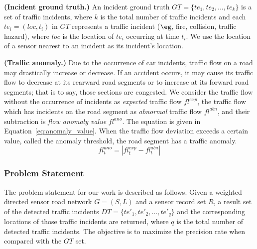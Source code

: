 \begin{Definition} \textbf{(Incident ground truth.)}
An incident ground truth $GT=\{te_1, te_2,...,te_k\}$ is a set of traffic incidents, where $k$ is the total number of traffic incidents and each $te_i = (loc, t_i)$ in $GT$ represents a traffic incident ($\eg$, fire, collision, traffic hazard), where $loc$ is the location of $te_i$ occurring at time $t_i$. We use the location of a sensor nearest to an incident as its incident's location. 
\end{Definition}

%
\begin{Definition} \textbf{(Traffic anomaly.)}
Due to the occurrence of car incidents, traffic flow on a road may drastically increase or decrease. If an accident occurs, it may cause its traffic flow to decrease at its rearward road segments or to increase at its forward road segments; that is to say, those sections are congested. We consider the traffic flow without the occurrence of incidents as \textit{expected} traffic flow $fl^{exp}$, the traffic flow which has incidents on the road segment as \textit{abnormal} traffic flow $fl^{abn}$, and their subtraction is \textit{flow anomaly value} $fl^{ano}$. The equation is given in Equation~\ref{eq:anomaly_value}. When the traffic flow deviation exceeds a certain value, called the anomaly threshold, the road segment has a traffic anomaly.
\begin{equation}\label{eq:anomaly_value}
	fl_t^{ano} = | fl_t^{exp} - fl_t^{abn} |
\end{equation} 
\end{Definition}

\subsubsection*{Problem Statement} 
The problem statement for our work is described as follows. Given a weighted directed sensor road network $G=(S,L)$ and a sensor record set $R$, a result set of the detected traffic incidents $DT=\{te'_1, te'_2,...,te'_q\}$ and the corresponding locations of those traffic incidents are returned, where $q$ is the total number of detected traffic incidents. The objective is to maximize the precision rate when compared with the $GT$ set.

